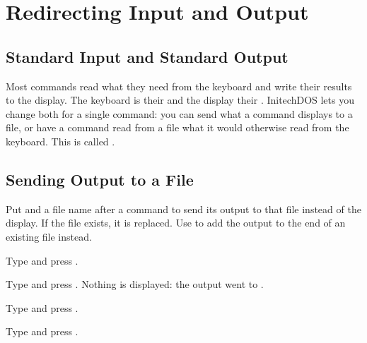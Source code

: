 \chapter{Redirecting Input and Output}

\section{Standard Input and Standard Output}
Most commands read what they need from the keyboard and write their results
to the display.  The keyboard is their  and the
display their .  InitechDOS lets you change both for
a single command: you can send what a command displays to a file, or have a
command read from a file what it would otherwise read from the keyboard.
This is called .

\section{Sending Output to a File}
Put \type{>} and a file name after a command to send its output to that file
instead of the display.  If the file exists, it is replaced.  Use \type{>>}
to add the output to the end of an existing file instead.
\begin{Steps}
\item Type  and press .
\item Type  and press .  Nothing is
  displayed: the output went to .
\item Type  and press .
\item Type  and press .
\end{Steps}

